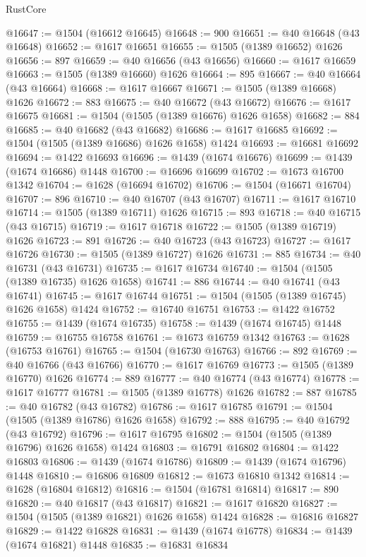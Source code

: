 \begin{lexlean}{RustCore}
\begin{coremodule}
@16647 := @1504 (@16612 @16645)
@16648 := 900
@16651 := @40 @16648 (@43 @16648)
@16652 := @1617 @16651
@16655 := @1505 (@1389 @16652) @1626
@16656 := 897
@16659 := @40 @16656 (@43 @16656)
@16660 := @1617 @16659
@16663 := @1505 (@1389 @16660) @1626
@16664 := 895
@16667 := @40 @16664 (@43 @16664)
@16668 := @1617 @16667
@16671 := @1505 (@1389 @16668) @1626
@16672 := 883
@16675 := @40 @16672 (@43 @16672)
@16676 := @1617 @16675
@16681 := @1504 (@1505 (@1389 @16676) @1626 @1658)
@16682 := 884
@16685 := @40 @16682 (@43 @16682)
@16686 := @1617 @16685
@16692 := @1504 (@1505 (@1389 @16686) @1626 @1658) @1424
@16693 := @16681 @16692
@16694 := @1422 @16693
@16696 := @1439 (@1674 @16676)
@16699 := @1439 (@1674 @16686) @1448
@16700 := @16696 @16699
@16702 := @1673 @16700 @1342
@16704 := @1628 (@16694 @16702)
@16706 := @1504 (@16671 @16704)
@16707 := 896
@16710 := @40 @16707 (@43 @16707)
@16711 := @1617 @16710
@16714 := @1505 (@1389 @16711) @1626
@16715 := 893
@16718 := @40 @16715 (@43 @16715)
@16719 := @1617 @16718
@16722 := @1505 (@1389 @16719) @1626
@16723 := 891
@16726 := @40 @16723 (@43 @16723)
@16727 := @1617 @16726
@16730 := @1505 (@1389 @16727) @1626
@16731 := 885
@16734 := @40 @16731 (@43 @16731)
@16735 := @1617 @16734
@16740 := @1504 (@1505 (@1389 @16735) @1626 @1658)
@16741 := 886
@16744 := @40 @16741 (@43 @16741)
@16745 := @1617 @16744
@16751 := @1504 (@1505 (@1389 @16745) @1626 @1658) @1424
@16752 := @16740 @16751
@16753 := @1422 @16752
@16755 := @1439 (@1674 @16735)
@16758 := @1439 (@1674 @16745) @1448
@16759 := @16755 @16758
@16761 := @1673 @16759 @1342
@16763 := @1628 (@16753 @16761)
@16765 := @1504 (@16730 @16763)
@16766 := 892
@16769 := @40 @16766 (@43 @16766)
@16770 := @1617 @16769
@16773 := @1505 (@1389 @16770) @1626
@16774 := 889
@16777 := @40 @16774 (@43 @16774)
@16778 := @1617 @16777
@16781 := @1505 (@1389 @16778) @1626
@16782 := 887
@16785 := @40 @16782 (@43 @16782)
@16786 := @1617 @16785
@16791 := @1504 (@1505 (@1389 @16786) @1626 @1658)
@16792 := 888
@16795 := @40 @16792 (@43 @16792)
@16796 := @1617 @16795
@16802 := @1504 (@1505 (@1389 @16796) @1626 @1658) @1424
@16803 := @16791 @16802
@16804 := @1422 @16803
@16806 := @1439 (@1674 @16786)
@16809 := @1439 (@1674 @16796) @1448
@16810 := @16806 @16809
@16812 := @1673 @16810 @1342
@16814 := @1628 (@16804 @16812)
@16816 := @1504 (@16781 @16814)
@16817 := 890
@16820 := @40 @16817 (@43 @16817)
@16821 := @1617 @16820
@16827 := @1504 (@1505 (@1389 @16821) @1626 @1658) @1424
@16828 := @16816 @16827
@16829 := @1422 @16828
@16831 := @1439 (@1674 @16778)
@16834 := @1439 (@1674 @16821) @1448
@16835 := @16831 @16834

\end{coremodule}
\end{lexlean}
